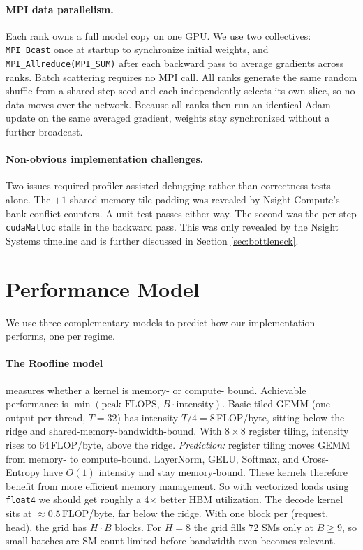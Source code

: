 \documentclass[11pt,letterpaper]{article}
\begin{document}
\paragraph{MPI data parallelism.}
Each rank owns a full model copy on one GPU. We use two collectives: \texttt{MPI\_Bcast} once at startup to synchronize initial weights, and \texttt{MPI\_Allreduce(MPI\_SUM)} after each backward pass to
average gradients across ranks. Batch scattering requires no MPI call. All ranks generate the same random shuffle from a shared step seed and each independently selects its own slice, so no data moves over
the network. Because all ranks then run an identical Adam update on the same averaged gradient, weights stay synchronized without a further broadcast.

\paragraph{Non-obvious implementation challenges.}
Two issues required profiler-assisted debugging rather than correctness tests alone. The $+1$ shared-memory tile padding was revealed by Nsight Compute's bank-conflict counters. A unit test passes either way. The second was the per-step \texttt{cudaMalloc} stalls in the backward pass. This was only revealed by the Nsight Systems timeline and is further discussed in Section \ref{sec:bottleneck}.

\section{Performance Model}\label{sec:perf_model}

We use three complementary models to predict how our implementation performs, one per regime.

\paragraph{The Roofline model~\cite{williams2009}} measures whether a kernel is memory- or compute- bound. 
Achievable performance is $\min(\text{peak FLOPS},\,B\cdot\text{intensity})$.
Basic tiled GEMM (one output per thread, $T{=}32$) has intensity $T/4{=}8$\,FLOP/byte,
sitting below the ridge and shared-memory-bandwidth-bound.
With $8{\times}8$ register tiling, intensity rises to 64\,FLOP/byte, above the ridge.
\emph{Prediction:} register tiling moves GEMM from memory- to compute-bound.
LayerNorm, GELU, Softmax, and Cross-Entropy have $O(1)$ intensity and stay
memory-bound. These kernels therefore benefit from more efficient memory management. So with vectorized loads using \texttt{float4} we should get roughly a 4$\times$ better HBM utilization.
The decode kernel sits at $\approx 0.5$\,FLOP/byte, far below the ridge.
With one block per (request, head), the grid has $H{\cdot}B$ blocks. For $H{=}8$
the grid fills 72 SMs only at $B \geq 9$, so small batches are SM-count-limited
before bandwidth even becomes relevant.
\end{document}
